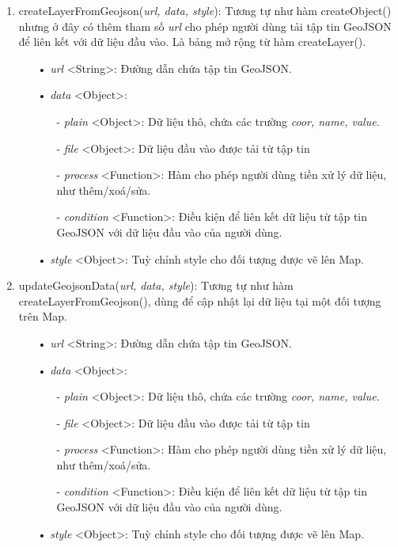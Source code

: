 \documentclass[12pt,a4paper]{article}
\begin{document}
\begin{enumerate}
\item \textsf{createLayerFromGeojson(\textit{url, data, style})}: Tương tự như hàm \textsf{createObject()} nhưng ở đây có thêm tham số \textit{url} cho phép người dùng tải tập tin GeoJSON để liên kết với dữ liệu đầu vào. Là bảng mở rộng từ hàm \textsf{createLayer()}.
	\begin{itemize}
		\item[•] \textit{url} <String>: Đường dẫn chứa tập tin GeoJSON.
		\item[•] \textit{data} <Object>:
		\begin{itemize}
			\item[-] \emph{plain} <Object>: Dữ liệu thô, chứa các trường \textit{coor, name, value}.
			\item[-] \emph{file} <Object>: Dữ liệu đầu vào được tải từ tập tin
			\item[-] \emph{process} <Function>: Hàm cho phép người dùng tiền xử lý dữ liệu, như thêm/xoá/sửa.
			\item[-] \emph{condition} <Function>: Điều kiện để liên kết dữ liệu từ tập tin GeoJSON với dữ liệu đầu vào của người dùng. 
		\end{itemize}
		\item[•] \textit{style} <Object>: Tuỳ chỉnh style cho đối tượng được vẽ lên Map.
	\end{itemize}
	
\item \textsf{updateGeojsonData(\textit{url, data, style})}: Tương tự như hàm \textsf{createLayerFromGeojson()}, dùng để cập nhật lại dữ liệu tại một đối tượng trên Map.
	\begin{itemize}
		\item[•] \textit{url} <String>: Đường dẫn chứa tập tin GeoJSON.
		\item[•] \textit{data} <Object>:
		\begin{itemize}
			\item[-] \emph{plain} <Object>: Dữ liệu thô, chứa các trường \textit{coor, name, value}.
			\item[-] \emph{file} <Object>: Dữ liệu đầu vào được tải từ tập tin
			\item[-] \emph{process} <Function>: Hàm cho phép người dùng tiền xử lý dữ liệu, như thêm/xoá/sửa.
			\item[-] \emph{condition} <Function>: Điều kiện để liên kết dữ liệu từ tập tin GeoJSON với dữ liệu đầu vào của người dùng. 
		\end{itemize}
		\item[•] \textit{style} <Object>: Tuỳ chỉnh style cho đối tượng được vẽ lên Map.
	\end{itemize}
	

\end{enumerate}
\end{document}
